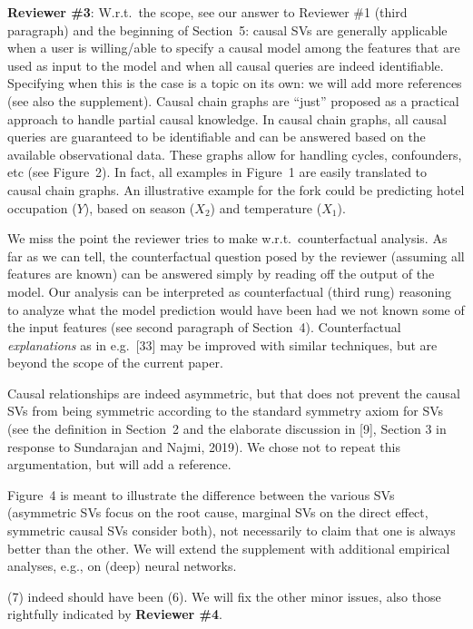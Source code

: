 \documentclass{article}
\begin{document}
{\bf Reviewer \#3}: W.r.t.\ the scope,
see our answer to Reviewer \#1 (third paragraph) and the beginning of Section~5: causal SVs are generally applicable when a user is willing/able to specify a causal model among the features that are used as input to the model and when all causal queries are indeed identifiable. Specifying when this is the case is a topic on its own: we will add more references (see also the supplement). Causal chain graphs are ``just'' proposed as a practical approach to handle partial causal knowledge. In causal chain graphs, all causal queries are guaranteed to be identifiable and can be answered based on the available observational data. These graphs allow for handling cycles, confounders, etc (see Figure~2). In fact, all examples in Figure~1 are easily translated to causal chain graphs. An illustrative example for the fork could be predicting hotel occupation ($Y$), based on season ($X_2$) and temperature ($X_1$).

We miss the point the reviewer tries to make w.r.t.\ counterfactual analysis. As far as we can tell, the counterfactual question posed by the reviewer (assuming all features are known) can be answered simply by reading off the output of the model. Our analysis can be interpreted as counterfactual (third rung) reasoning to analyze what the model prediction would have been had we not known some of the input features (see second paragraph of Section~4). Counterfactual {\em explanations} as in e.g.~[33] may be improved with similar techniques, but are beyond the scope of the current paper.

Causal relationships are indeed asymmetric, but that does not prevent the causal SVs from being symmetric according to the standard symmetry axiom for SVs (see the definition in Section~2 and the elaborate discussion in [9], Section 3 in response to Sundarajan and Najmi, 2019). We chose not to repeat this argumentation, but will add a reference.

Figure~4 is meant to illustrate the difference between the various SVs (asymmetric SVs focus on the root cause, marginal SVs on the direct effect, symmetric causal SVs consider both), not necessarily to claim that one is always better than the other. We will extend the supplement with additional empirical analyses, e.g., on (deep) neural networks.

(7) indeed should have been (6). We will fix the other minor issues, also those rightfully indicated by {\bf Reviewer \#4}.
\end{document}
